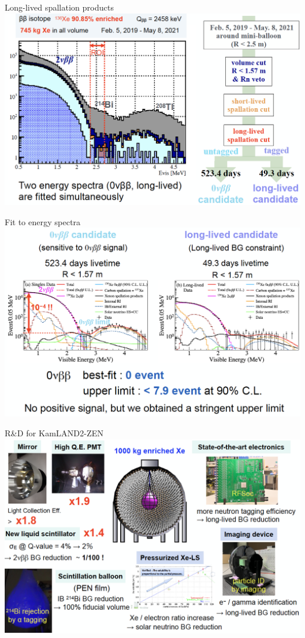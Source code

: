 \documentclass [aspectratio=169]{beamer}
\begin{document}
\begin{frame}{Long-lived spallation products}
\includegraphics[scale=0.30]{kzeventselection.png}
\end{frame}

\begin{frame}{Fit to energy spectra}
\includegraphics[scale=0.30]{fitkz.png}
\end{frame}

\begin{frame}{R\&D for KamLAND2-ZEN}
\includegraphics[scale=0.30]{rdkz2.png}
\end{frame}
\end{document}
